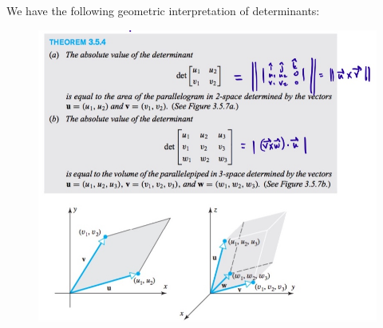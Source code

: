 \documentclass[12pt,letterpaper,reqno]{article}
\numberwithin{equation}{section}
\begin{document}
\begin{prop}
We have the following geometric interpretation of determinants:
	\begin{figure}[h]
			\begin{center}
				\includegraphics[scale=0.4]{figures_mvc/whole_enchilada}
			\end{center}
	\end{figure}
\end{prop}
\end{document}
